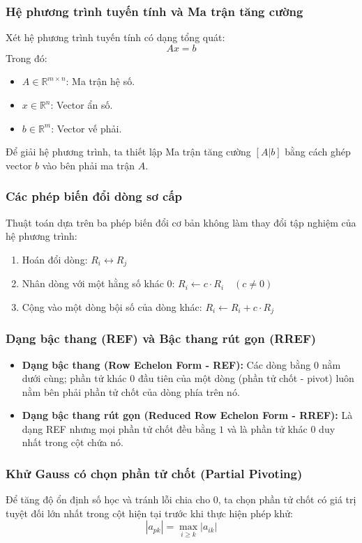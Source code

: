 \documentclass[a4paper]{article}
\begin{document}
\subsubsection{Hệ phương trình tuyến tính và Ma trận tăng cường}
Xét hệ phương trình tuyến tính có dạng tổng quát:
\begin{equation}
    Ax = b
\end{equation}
Trong đó:
\begin{itemize}
    \item $A \in \mathbb{R}^{m \times n}$: Ma trận hệ số.
    \item $x \in \mathbb{R}^n$: Vector ẩn số.
    \item $b \in \mathbb{R}^m$: Vector vế phải.
\end{itemize}
Để giải hệ phương trình, ta thiết lập Ma trận tăng cường $[A|b]$ bằng cách ghép vector $b$ vào bên phải ma trận $A$.

\subsubsection{Các phép biến đổi dòng sơ cấp}
Thuật toán dựa trên ba phép biến đổi cơ bản không làm thay đổi tập nghiệm của hệ phương trình:
\begin{enumerate}
    \item Hoán đổi dòng: $R_i \leftrightarrow R_j$
    \item Nhân dòng với một hằng số khác 0: $R_i \leftarrow c \cdot R_i \quad (c \neq 0)$
    \item Cộng vào một dòng bội số của dòng khác: $R_i \leftarrow R_i + c \cdot R_j$
\end{enumerate}

\subsubsection{Dạng bậc thang (REF) và Bậc thang rút gọn (RREF)}
\begin{itemize}
    \item \textbf{Dạng bậc thang (Row Echelon Form - REF):} Các dòng bằng 0 nằm dưới cùng; phần tử khác 0 đầu tiên của một dòng (phần tử chốt - pivot) luôn nằm bên phải phần tử chốt của dòng phía trên nó.
    \item \textbf{Dạng bậc thang rút gọn (Reduced Row Echelon Form - RREF):} Là dạng REF nhưng mọi phần tử chốt đều bằng $1$ và là phần tử khác 0 duy nhất trong cột chứa nó.
\end{itemize}

\subsubsection{Khử Gauss có chọn phần tử chốt (Partial Pivoting)}
Để tăng độ ổn định số học và tránh lỗi chia cho $0$, ta chọn phần tử chốt có giá trị tuyệt đối lớn nhất trong cột hiện tại trước khi thực hiện phép khử:
\begin{equation}
    |a_{pk}| = \max_{i \geq k} |a_{ik}|
\end{equation}
\end{document}
